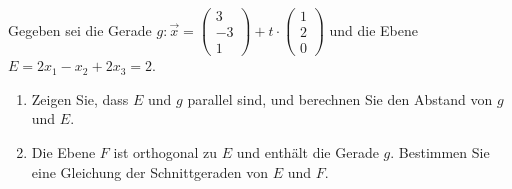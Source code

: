 \aufgabe{}
Gegeben sei die Gerade $g: \vec x=\left(\begin{array}{c} 3 \\ -3 \\ 1 \end{array}\right) + t\cdot \left( \begin{array}{c} 1 \\ 2 \\ 0 \end{array} \right)$ und die Ebene $E = 2x_1-x_2+2x_3=2$. 
\begin{enumerate}
  \item Zeigen Sie, dass $E$ und $g$ parallel sind, und berechnen Sie den Abstand von $g$ und $E$.
  \item Die Ebene $F$ ist orthogonal zu $E$ und enthält die Gerade $g$. Bestimmen Sie eine Gleichung der Schnittgeraden von $E$ und $F$.
\end{enumerate}
